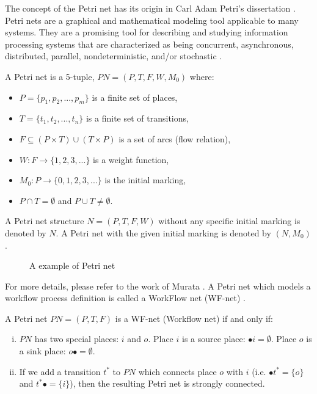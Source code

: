 \documentclass{llncs}
\begin{document}
The concept of the Petri net has its origin in Carl Adam Petri's dissertation \cite{petri1966kommunikation}. Petri nets are a graphical and mathematical modeling tool applicable to many systems. They are a promising tool for describing and studying information processing systems that are characterized as being concurrent, asynchronous, distributed, parallel, nondeterministic, and/or stochastic \cite{murata1989petri}.

\begin{definition}\label{def:petrinet}
A Petri net is a 5-tuple, $PN=(P,T,F,W,M_{0})$ where:
	\begin{itemize}
		\item[] $P=\{p_{1},p_{2},...,p_{m}\}$ is a finite set of places,
		\item[] $T=\{t_{1},t_{2},...,t_{n}\}$ is a finite set of transitions,
		\item[] $F\subseteq(P\times T)\cup(T\times P)$ is a set of arcs (flow relation),
		\item[] $W:F\rightarrow\{1,2,3,...\}$ is a weight function,
		\item[] $M_{0}:P\rightarrow\{0,1,2,3,...\}$ is the initial marking,
		\item[] $P\cap T=\emptyset$ and $P\cup T\neq\emptyset$.
	\end{itemize}
A Petri net structure $N=(P,T,F,W)$ without any specific initial marking is denoted by $N$. A Petri net with the given initial marking is denoted by $(N,M_{0})$.
\end{definition}

\begin{figure}[!htb]
	\centering
	\caption{A example of Petri net\label{fig:exPetri}}
\end{figure}

For more details, please refer to the work of Murata \cite{murata1989petri}. A Petri net which models a workflow process definition is called a WorkFlow net (WF-net) \cite{van1998application}.

\begin{definition}[WF-net]\label{def:wfnet}
A Petri net $PN=(P,T,F)$ is a WF-net (Workflow net) if and only if:
	\begin{enumerate}[(i)]
		\item $PN$ has two special places: $i$ and $o$. Place $i$ is a source place: $\bullet i=\emptyset$. Place $o$ is a sink place: $o\bullet =\emptyset$.
		\item If we add a transition $t^{*}$ to $PN$ which connects place $o$ with $i$ (i.e. $\bullet t^{*}=\{o\}$ and $t^{*}\bullet=\{i\}$), then the resulting Petri net is strongly connected.
	\end{enumerate}
\end{definition}
\end{document}
